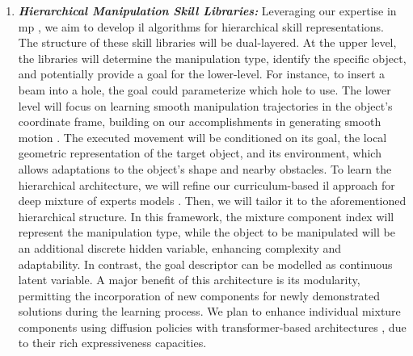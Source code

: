 \documentclass{erc-B2}
\begin{document}
\begin{enumerate}%
\item \textit{\textbf{Hierarchical Manipulation Skill Libraries:}}  Leveraging our expertise in \gls*{mp} \cite{paraschos2013probabilistic, li2023prodmp}, we aim to develop \gls*{il} algorithms for hierarchical skill representations. The structure of these skill libraries will be dual-layered. At the upper level, the libraries will determine the manipulation type, identify the specific object, and potentially provide a goal for the lower-level. For instance, to insert a beam into a hole, the goal could parameterize which hole to use. 
The lower level will focus on learning smooth manipulation trajectories in the object's coordinate frame, building on our accomplishments in generating smooth motion \cite{li2023prodmp}. The executed movement will be conditioned on its goal, the local geometric representation of the target object, and its environment, which allows adaptations to the object's shape and nearby obstacles.
To learn the hierarchical architecture, we will refine our curriculum-based \gls*{il} approach for deep mixture of experts models \cite{blessing2023information}. Then, we will tailor it to the aforementioned hierarchical structure. 
In this framework, the mixture component index will represent the manipulation type, while the object to be manipulated will be an additional discrete hidden variable, enhancing complexity and adaptability. In contrast, the goal descriptor can be modelled as continuous latent variable. A major benefit of this architecture is its modularity, permitting the incorporation of new components for newly demonstrated solutions during the learning process. We plan to enhance individual mixture components using diffusion policies with transformer-based architectures \cite{chi2023diffusion,David2024}, due to their rich expressiveness capacities. %


\end{enumerate}
\end{document}
